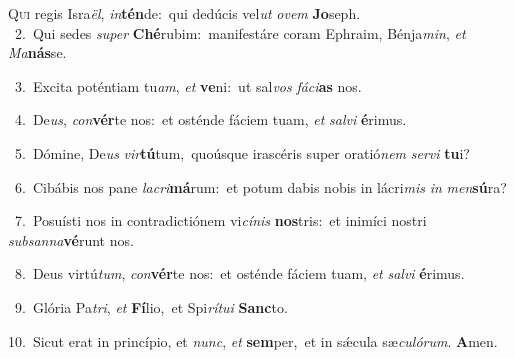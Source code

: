\lettrine{\initial\textcolor{\initialcolor}{Q}}{ui} regis Isra\-\textit{ël}\-, \textit{in}\-\textbf{tén}de:~\star qui dedúcis vel\textit{ut} \textit{o}\-\textit{vem} \textbf{Jo}\-seph.\\
{\numbfont\textcolor{\numbcolor}{~2.}}~Qui sedes \textit{su}\-\textit{per} \textbf{Ché}\-rubim:~\star manifestáre coram Ephraim, Bénja\-\textit{min}\-, \textit{et} \textit{Ma}\-\textbf{nás}se.\par
{\numbfont\textcolor{\numbcolor}{~3.}}~Excita poténtiam tu\-\textit{am}\-, \textit{et} \textbf{ve}\-ni:~\star ut sal\textit{vos} \textit{fá}\-\textit{ci}\textbf{as} nos.\par
{\numbfont\textcolor{\numbcolor}{~4.}}~De\-\textit{us}\-, \textit{con}\-\textbf{vér}te nos:~\star et osténde fáciem tuam, \textit{et} \textit{sal}\-\textit{vi} \textbf{é}\-rimus.\par
{\numbfont\textcolor{\numbcolor}{~5.}}~Dómine, De\textit{us} \textit{vir}\-\textbf{tú}tum,~\star quoúsque irascéris super oratió\textit{nem} \textit{ser}\-\textit{vi} \textbf{tu}\-i?\par
{\numbfont\textcolor{\numbcolor}{~6.}}~Cibábis nos pane \textit{la}\-\textit{cri}\textbf{má}rum:~\star et potum dabis nobis in lácri\textit{mis} \textit{in} \textit{men}\-\textbf{sú}ra?\par
{\numbfont\textcolor{\numbcolor}{~7.}}~Posuísti nos in contradictiónem vi\-\textit{cí}\-\textit{nis} \textbf{nos}\-tris:~\star et inimíci nostri \textit{sub}\-\textit{san}\textit{na}\textbf{vé}runt nos.\par
{\numbfont\textcolor{\numbcolor}{~8.}}~Deus virtú\-\textit{tum}\-, \textit{con}\-\textbf{vér}te nos:~\star et osténde fáciem tuam, \textit{et} \textit{sal}\-\textit{vi} \textbf{é}\-rimus.\par
{\numbfont\textcolor{\numbcolor}{~9.}}~Glória Pa\-\textit{tri}\-, \textit{et} \textbf{Fí}\-lio,~\star et Spi\-\textit{rí}\-\textit{tu}\textit{i} \textbf{Sanc}\-to.\par
{\numbfont\textcolor{\numbcolor}{10.}}~Sicut erat in princípio, et \textit{nunc}\-, \textit{et} \textbf{sem}\-per,~\star et in sǽcula sæ\-\textit{cu}\-\textit{ló}\textit{rum}. \textbf{A}\-men.\par
